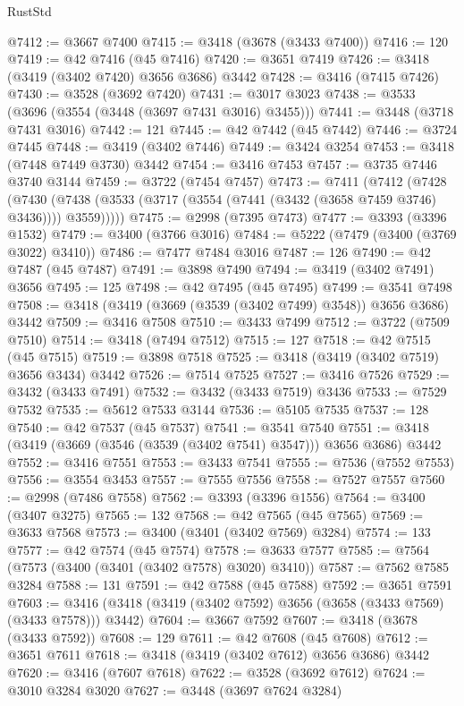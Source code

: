 \begin{lexlean}{RustStd}
\begin{coremodule}
@7412 := @3667 @7400
@7415 := @3418 (@3678 (@3433 @7400))
@7416 := 120
@7419 := @42 @7416 (@45 @7416)
@7420 := @3651 @7419
@7426 := @3418 (@3419 (@3402 @7420) @3656 @3686) @3442
@7428 := @3416 (@7415 @7426)
@7430 := @3528 (@3692 @7420)
@7431 := @3017 @3023
@7438 := @3533 (@3696 (@3554 (@3448 (@3697 @7431 @3016) @3455)))
@7441 := @3448 (@3718 @7431 @3016)
@7442 := 121
@7445 := @42 @7442 (@45 @7442)
@7446 := @3724 @7445
@7448 := @3419 (@3402 @7446)
@7449 := @3424 @3254
@7453 := @3418 (@7448 @7449 @3730) @3442
@7454 := @3416 @7453
@7457 := @3735 @7446 @3740 @3144
@7459 := @3722 (@7454 @7457)
@7473 := @7411
    (@7412
      (@7428
        (@7430 (@7438 (@3533 (@3717 (@3554 (@7441 (@3432 (@3658 @7459 @3746) @3436)))) @3559)))))
@7475 := @2998 (@7395 @7473)
@7477 := @3393 (@3396 @1532)
@7479 := @3400 (@3766 @3016)
@7484 := @5222 (@7479 (@3400 (@3769 @3022) @3410))
@7486 := @7477 @7484 @3016
@7487 := 126
@7490 := @42 @7487 (@45 @7487)
@7491 := @3898 @7490
@7494 := @3419 (@3402 @7491) @3656
@7495 := 125
@7498 := @42 @7495 (@45 @7495)
@7499 := @3541 @7498
@7508 := @3418 (@3419 (@3669 (@3539 (@3402 @7499) @3548)) @3656 @3686) @3442
@7509 := @3416 @7508
@7510 := @3433 @7499
@7512 := @3722 (@7509 @7510)
@7514 := @3418 (@7494 @7512)
@7515 := 127
@7518 := @42 @7515 (@45 @7515)
@7519 := @3898 @7518
@7525 := @3418 (@3419 (@3402 @7519) @3656 @3434) @3442
@7526 := @7514 @7525
@7527 := @3416 @7526
@7529 := @3432 (@3433 @7491)
@7532 := @3432 (@3433 @7519) @3436
@7533 := @7529 @7532
@7535 := @5612 @7533 @3144
@7536 := @5105 @7535
@7537 := 128
@7540 := @42 @7537 (@45 @7537)
@7541 := @3541 @7540
@7551 := @3418 (@3419 (@3669 (@3546 (@3539 (@3402 @7541) @3547))) @3656 @3686) @3442
@7552 := @3416 @7551
@7553 := @3433 @7541
@7555 := @7536 (@7552 @7553)
@7556 := @3554 @3453
@7557 := @7555 @7556
@7558 := @7527 @7557
@7560 := @2998 (@7486 @7558)
@7562 := @3393 (@3396 @1556)
@7564 := @3400 (@3407 @3275)
@7565 := 132
@7568 := @42 @7565 (@45 @7565)
@7569 := @3633 @7568
@7573 := @3400 (@3401 (@3402 @7569) @3284)
@7574 := 133
@7577 := @42 @7574 (@45 @7574)
@7578 := @3633 @7577
@7585 := @7564 (@7573 (@3400 (@3401 (@3402 @7578) @3020) @3410))
@7587 := @7562 @7585 @3284
@7588 := 131
@7591 := @42 @7588 (@45 @7588)
@7592 := @3651 @7591
@7603 := @3416 (@3418 (@3419 (@3402 @7592) @3656 (@3658 (@3433 @7569) (@3433 @7578))) @3442)
@7604 := @3667 @7592
@7607 := @3418 (@3678 (@3433 @7592))
@7608 := 129
@7611 := @42 @7608 (@45 @7608)
@7612 := @3651 @7611
@7618 := @3418 (@3419 (@3402 @7612) @3656 @3686) @3442
@7620 := @3416 (@7607 @7618)
@7622 := @3528 (@3692 @7612)
@7624 := @3010 @3284 @3020
@7627 := @3448 (@3697 @7624 @3284)

\end{coremodule}
\end{lexlean}
